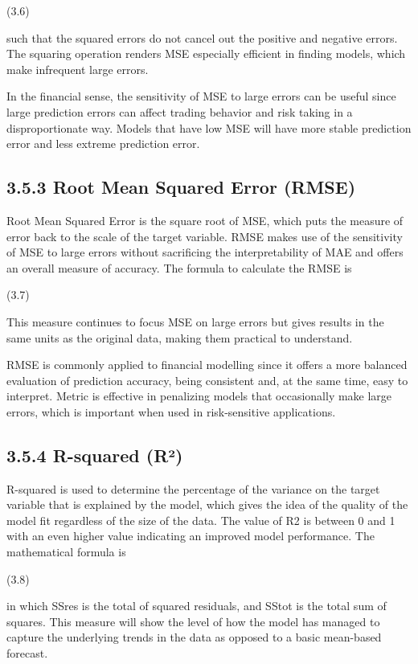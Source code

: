 \documentclass[12pt,a4paper]{report}
\begin{document}
								(3.6)

such that the squared errors do not cancel out the positive and negative errors. The squaring operation renders MSE especially efficient in finding models, which make infrequent large errors.

In the financial sense, the sensitivity of MSE to large errors can be useful since large prediction errors can affect trading behavior and risk taking in a disproportionate way. Models that have low MSE will have more stable prediction error and less extreme prediction error.

\subsection{3.5.3 Root Mean Squared Error (RMSE)}
Root Mean Squared Error is the square root of MSE, which puts the measure of error back to the scale of the target variable. RMSE makes use of the sensitivity of MSE to large errors without sacrificing the interpretability of MAE and offers an overall measure of accuracy. The formula to calculate the RMSE is

								(3.7)

This measure continues to focus MSE on large errors but gives results in the same units as the original data, making them practical to understand.

RMSE is commonly applied to financial modelling since it offers a more balanced evaluation of prediction accuracy, being consistent and, at the same time, easy to interpret. Metric is effective in penalizing models that occasionally make large errors, which is important when used in risk-sensitive applications.

\subsection{3.5.4 R-squared (R²)}
R-squared is used to determine the percentage of the variance on the target variable that is explained by the model, which gives the idea of the quality of the model fit regardless of the size of the data. The value of R2 is between 0 and 1 with an even higher value indicating an improved model performance. The mathematical formula is

								(3.8)

in which SSres is the total of squared residuals, and SStot is the total sum of squares. This measure will show the level of how the model has managed to capture the underlying trends in the data as opposed to a basic mean-based forecast.
\end{document}
